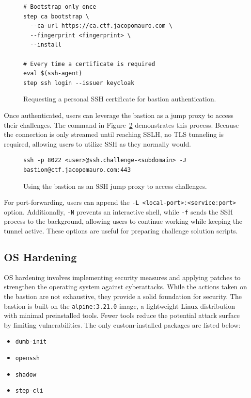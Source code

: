\begin{figure}[h]
    \centering
\begin{verbatim}
# Bootstrap only once
step ca bootstrap \
  --ca-url https://ca.ctf.jacopomauro.com \
  --fingerprint <fingerprint> \
  --install

# Every time a certificate is required
eval $(ssh-agent)
step ssh login --issuer keycloak
\end{verbatim}
    \caption{Requesting a personal SSH certificate for bastion authentication.}
    \label{fig:bastion_certificate_request}
\end{figure}

Once authenticated, users can leverage the bastion as a jump proxy to access their challenges. The command in Figure~\ref{fig:bastion_ssh_command} demonstrates this process. Because the connection is only streamed until reaching SSLH, no TLS tunneling is required, allowing users to utilize SSH as they normally would.

\begin{figure}[h]
    \centering
\begin{verbatim}
ssh -p 8022 <user>@ssh.challenge-<subdomain> -J bastion@ctf.jacopomauro.com:443 
\end{verbatim}
    \caption{Using the bastion as an SSH jump proxy to access challenges.}
    \label{fig:bastion_ssh_command}
\end{figure}

For port-forwarding, users can append the \texttt{-L <local-port>:<service:port>} option. Additionally, \texttt{-N} prevents an interactive shell, while \texttt{-f} sends the SSH process to the background, allowing users to continue working while keeping the tunnel active. These options are useful for preparing challenge solution scripts.

\subsection{OS Hardening}
OS hardening involves implementing security measures and applying patches to strengthen the operating system against cyberattacks. While the actions taken on the bastion are not exhaustive, they provide a solid foundation for security. The bastion is built on the \texttt{alpine:3.21.0} image, a lightweight Linux distribution with minimal preinstalled tools. Fewer tools reduce the potential attack surface by limiting vulnerabilities. The only custom-installed packages are listed below:

\begin{multicols}{2} 
    \begin{itemize}
        \item \texttt{dumb-init}
        \item \texttt{openssh}
        \item \texttt{shadow}
        \item \texttt{step-cli}
    \end{itemize}
\end{multicols}

